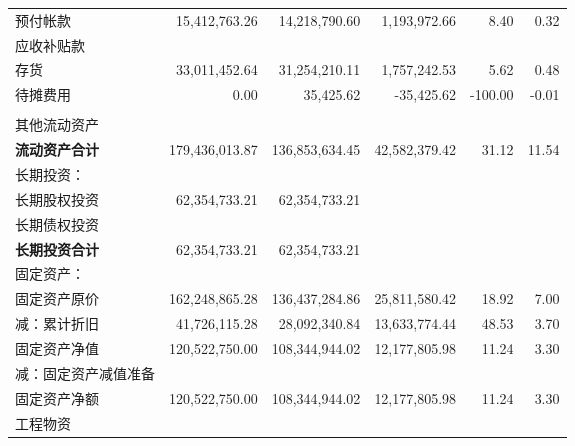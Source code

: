 \begin{longtable}{>{\scriptsize}p{8em}>{\scriptsize}r>{\scriptsize}r>{\scriptsize}r>{\scriptsize}r>{\scriptsize}r}
    \hspace{2ex}预付帐款 & 15,412,763.26 & 14,218,790.60 & 1,193,972.66 & 8.40 & 0.32\\
    \hspace{2ex}应收补贴款 &  &  &  &  & 					\\
    \hspace{2ex}存货 & 33,011,452.64 & 31,254,210.11 & 1,757,242.53 & 5.62 & 0.48\\
    \hspace{2ex}待摊费用 & 0.00 & 35,425.62 & -35,425.62 & -100.00 & -0.01\\
    \hspace{2ex}{\scriptsize 一年内到期长期债券投资} &  &  &  &  & 					\\
    \hspace{2ex}其他流动资产 &   &  &  &  & 								\\	
    \hspace{2ex}\bfseries 流动资产合计 & 179,436,013.87 & 136,853,634.45 & 42,582,379.42 & 31.12 & 11.54\\
长期投资： &  &  &  &  & 					\\
    \hspace{2ex}长期股权投资 & 62,354,733.21 & 62,354,733.21 &  &  & \\
    \hspace{2ex}长期债权投资 &  &  &  &  & 				\\
    \hspace{2ex}\bfseries 长期投资合计 & 62,354,733.21 & 62,354,733.21 &  &  & \\
固定资产： &  &  &  &  & 					\\
    \hspace{2ex}固定资产原价 & 162,248,865.28 & 136,437,284.86 & 25,811,580.42 & 18.92 & 7.00\\
        \hspace{3ex}减：累计折旧 & 41,726,115.28 & 28,092,340.84 & 13,633,774.44 & 48.53 & 3.70\\
    \hspace{2ex}固定资产净值 & 120,522,750.00 & 108,344,944.02 & 12,177,805.98 & 11.24 & 3.30\\
        \hspace{3ex}减：固定资产减值准备 &  &  &  &  & 			\\
    \hspace{2ex}固定资产净额 & 120,522,750.00 & 108,344,944.02 & 12,177,805.98 & 11.24 & 3.30\\
    \hspace{2ex}工程物资 &  &  &  &  & 				\\

\end{longtable}
